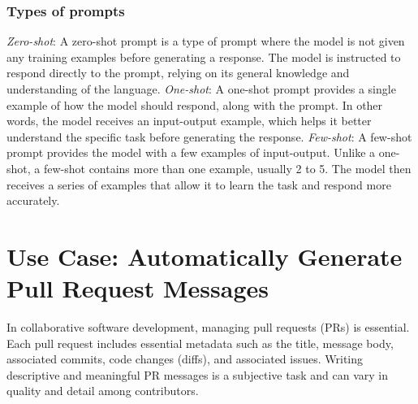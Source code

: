 \subsubsection{Types of prompts}
\textit{Zero-shot}:\newline
A zero-shot prompt is a type of prompt where the model is not given any training examples before generating a response. The model is instructed to respond directly to the prompt, relying on its general knowledge and understanding of the language.\newline
\textit{One-shot}:\newline
A one-shot prompt provides a single example of how the model should respond, along with the prompt. In other words, the model receives an input-output example, which helps it better understand the specific task before generating the response.\newline
\textit{Few-shot}:\newline
A few-shot prompt provides the model with a few examples of input-output. Unlike a one-shot, a few-shot contains more than one example, usually 2 to 5. The model then receives a series of examples that allow it to learn the task and respond more accurately.
\section{Use Case: Automatically Generate Pull Request Messages}
In collaborative software development, managing pull requests (PRs) is essential. Each pull request includes essential metadata such as the title, message body, associated commits, code changes (diffs), and associated issues. Writing descriptive and meaningful PR messages is a subjective task and can vary in quality and detail among contributors.
